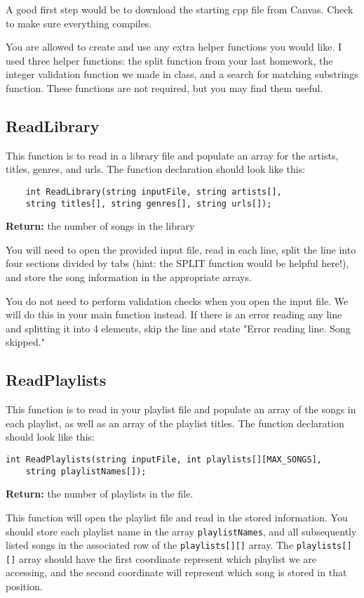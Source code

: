 A good first step would be to download the starting cpp file from Canvas. Check to make sure everything compiles.

You are allowed to create and use any extra helper functions you would like. I used three helper functions: the split function from your last homework, the integer validation function we made in class, and a search for matching substrings function. These functions are not required, but you may find them useful.

\subsection{ReadLibrary \star \star}
This function is to read in a library file and populate an array for the artists, titles, genres, and urls. The function declaration should look like this:

\begin{verbatim}
    int ReadLibrary(string inputFile, string artists[], 
    string titles[], string genres[], string urls[]);
\end{verbatim}

\textbf{Return:} the number of songs in the library

You will need to open the provided input file, read in each line, split the line into four sections divided by tabs (hint: the SPLIT function would be helpful here!), and store the song information in the appropriate arrays. 

You do not need to perform validation checks when you open the input file. We will do this in your main function instead. If there is an error reading any line and splitting it into 4 elements, skip the line and state "Error reading line. Song skipped."

\subsection{ReadPlaylists \star \star}
This function is to read in your playlist file and populate an array of the songs in each playlist, as well as an array of the playlist titles. The function declaration should look like this:

\begin{verbatim}
int ReadPlaylists(string inputFile, int playlists[][MAX_SONGS], 
    string playlistNames[]);
\end{verbatim}

\textbf{Return:} the number of playlists in the file. 

This function will open the playlist file and read in the stored information. You should store each playlist name in the array \texttt{playlistNames}, and all subsequently listed songs in the associated row of the \texttt{playlists[][]} array. The \texttt{playlists[][]} array should have the first coordinate represent which playlist we are accessing, and the second coordinate will represent which song is stored in that position.

